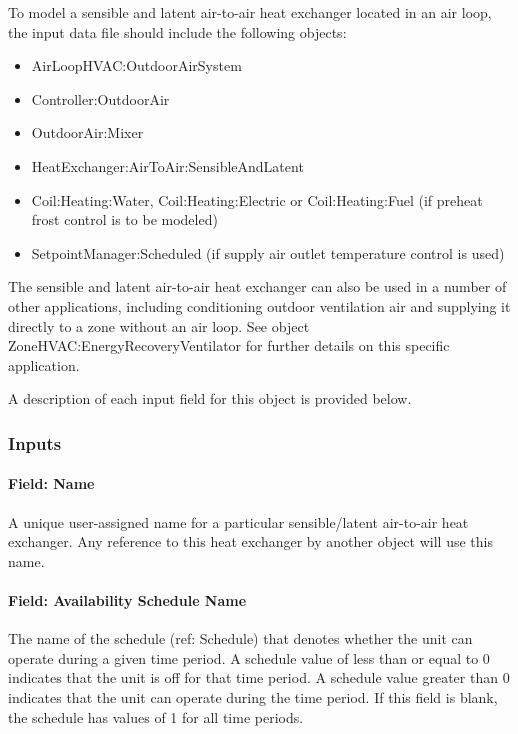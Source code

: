 To model a sensible and latent air-to-air heat exchanger located in an air loop, the input data file should include the following objects:

\begin{itemize}
\item
  AirLoopHVAC:OutdoorAirSystem
\item
  Controller:OutdoorAir
\item
  OutdoorAir:Mixer
\item
  HeatExchanger:AirToAir:SensibleAndLatent
\item
  Coil:Heating:Water, Coil:Heating:Electric or Coil:Heating:Fuel (if preheat frost control is to be modeled)
\item
  SetpointManager:Scheduled (if supply air outlet temperature control is used)
\end{itemize}

The sensible and latent air-to-air heat exchanger can also be used in a number of other applications, including conditioning outdoor ventilation air and supplying it directly to a zone without an air loop. See object ZoneHVAC:EnergyRecoveryVentilator for further details on this specific application.

A description of each input field for this object is provided below.

\subsubsection{Inputs}\label{inputs-1-019}

\paragraph{Field: Name}\label{field-name-1-018}

A unique user-assigned name for a particular sensible/latent air-to-air heat exchanger. Any reference to this heat exchanger by another object will use this name.

\paragraph{Field: Availability Schedule Name}\label{field-availability-schedule-name-1-006}

The name of the schedule (ref: Schedule) that denotes whether the unit can operate during a given time period. A schedule value of less than or equal to 0 indicates that the unit is off for that time period. A schedule value greater than 0 indicates that the unit can operate during the time period. If this field is blank, the schedule has values of 1 for all time periods.

